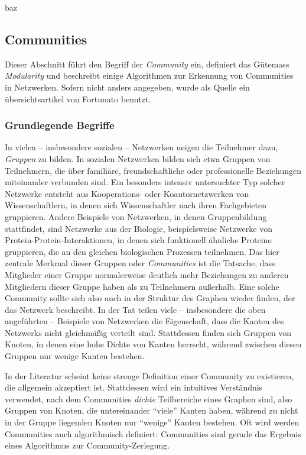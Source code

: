 \cite{Barabasi1999} 
baz

\subsection{Communities}
\label{ch:Grundlagen:sec:Netzwerkanalyse:subsec:Communities}

Dieser Abschnitt führt den Begriff der \emph{Community} ein,
definiert das Gütemass \emph{Modularity} und beschreibt einige
Algorithmen zur Erkennung von Communities in Netzwerken. Sofern nicht
anders angegeben, wurde als Quelle ein übersichtsartikel von
Fortunato \cite{Fortunato2010} benutzt.

\subsubsection{Grundlegende Begriffe}
\label{sec:grundl-begr}

In vielen -- insbesondere sozialen -- Netzwerken neigen die Teilnehmer
dazu, \emph{Gruppen} zu bilden. In sozialen Netzwerken bilden sich
etwa Gruppen von Teilnehmern, die über familiäre,
freundschaftliche oder professionelle Beziehungen miteinander
verbunden sind. Ein besonders intensiv untersuchter Typ solcher
Netzwerke entsteht aus Kooperations- oder Koautornetzwerken von
Wissenschaftlern, in denen sich Wissenschaftler nach ihren
Fachgebieten gruppieren. Andere Beispiele von Netzwerken, in denen
Gruppenbildung stattfindet, sind Netzwerke aus der Biologie,
beispielsweise Netzwerke von Protein-Protein-Interaktionen, in denen
sich funktionell ähnliche Proteine gruppieren, die an den gleichen
biologischen Prozessen teilnehmen. Das hier zentrale Merkmal dieser
Gruppen oder \emph{Communities} ist die Tatsache, dass Mitglieder
einer Gruppe normalerweise deutlich mehr Beziehungen zu anderen
Mitgliedern dieser Gruppe haben als zu Teilnehmern außerhalb. Eine
solche Community sollte sich also auch in der Struktur des Graphen
wieder finden, der das Netzwerk beschreibt. In der Tat teilen viele --
insbesondere die oben angeführten -- Beispiele von Netzwerken die
Eigenschaft, dass die Kanten des Netzwerks nicht gleichmäßig
verteilt sind. Stattdessen finden sich Gruppen von Knoten, in denen
eine hohe Dichte von Kanten herrscht, während zwischen diesen
Gruppen nur wenige Kanten bestehen.

In der Literatur scheint keine strenge Definition einer Community zu
existieren, die allgemein akzeptiert ist. Stattdessen wird ein
intuitives Verständnis verwendet, nach dem Communities \emph{dichte}
Teilbereiche eines Graphen sind, also Gruppen von Knoten, die
untereinander ``viele'' Kanten haben, während zu nicht in der Gruppe
liegenden Knoten nur ``wenige'' Kanten bestehen. Oft wird werden
Communities auch algorithmisch definiert: Communities sind gerade das
Ergebnis eines Algorithmus zur Community-Zerlegung.

